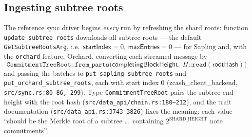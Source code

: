 \documentclass[11pt,a4paper]{article}
\theoremstyle{definition}
\begin{document}
\subsection{Ingesting subtree roots}\label{sec:sync-tree-roots}

The reference sync driver begins \emph{every} run by refreshing the
shard roots: function \texttt{update\_subtree\_roots} downloads all
subtree roots --- the default \texttt{GetSubtreeRootsArg}, i.e.\
$\mathsf{startIndex} = 0$, $\mathsf{maxEntries} = 0$ --- for Sapling and,
with the \texttt{orchard} feature, Orchard, converting each streamed
message by
\[
\texttt{CommitmentTreeRoot::from\_parts}\bigl(
\mathsf{completingBlockHeight},\ H\texttt{::read}(\mathsf{rootHash})
\bigr)
\]
and passing the batches to \texttt{put\_sapling\_subtree\_roots} and
\texttt{put\_orchard\_subtree\_roots}, each with start index $0$
(\textsf{zcash\_client\_backend},
\texttt{src/sync.rs:80--86,--299}).
Type \texttt{CommitmentTreeRoot} pairs the subtree end height with the
root hash (\texttt{src/data\_api/}\allowbreak\texttt{chain.rs:180--212}),
and the trait
documentation (\texttt{src/data\_api.rs:3743--3826}) fixes the meaning:
each value ``should be the Merkle root of a subtree \ldots\ containing
$2^{\mathrm{SHARD\_HEIGHT}}$ note commitments''.
\end{document}
